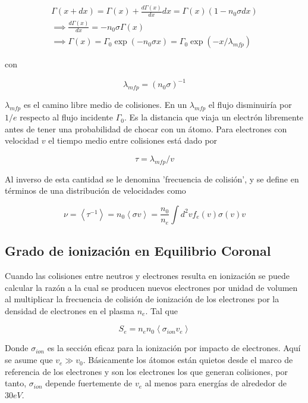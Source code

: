 \documentclass[11pt]{article}
\theoremstyle{definition}
\begin{document}
  \begin{eqnarray*}
    \Gamma(x + dx) = \Gamma(x) + \frac{d\Gamma(x)}{dx}dx = \Gamma(x)(1 - n_0\sigma dx)\\
    \implies \frac{d\Gamma(x)}{dx} = -n_0\sigma\Gamma(x) \\
    \implies \Gamma(x) = \Gamma_0\exp{(-n_0\sigma x)} = \Gamma_0\exp{(-x/\lambda_{mfp})}
  \end{eqnarray*}

  con 

  \begin{equation}
    \lambda_{mfp} = (n_0\sigma)^{-1}
  \end{equation}

  $\lambda_{mfp}$ es el camino libre medio de colisiones. En un $\lambda_{mfp}$ el flujo disminuir\'ia por $1/e$ respecto al flujo incidente $\Gamma_0$. Es la distancia que viaja un electr\'on libremente antes de tener una probabilidad de chocar con un \'atomo. Para electrones con velocidad $v$ el tiempo medio entre colisiones est\'a dado por 

  \begin{equation}
    \tau = \lambda_{mfp}/v
  \end{equation}

  Al inverso de esta cantidad se le denomina 'frecuencia de colisi\'on', y se define en t\'erminos de una distribuci\'on de velocidades como

  \begin{equation}
    \nu = \left<\tau^{-1}\right> = n_0\left<\sigma v\right> = \frac{n_0}{n_e}\int d^2v f_e(v)\sigma(v)v
  \end{equation}

  \subsection{Grado de ionizaci\'on en Equilibrio Coronal}

  Cuando las colisiones entre neutros y electrones resulta en ionizaci\'on se puede calcular la raz\'on a la cual se producen nuevos electrones por unidad de volumen al multiplicar la frecuencia de colisi\'on de ionizaci\'on de los electrones por la densidad de electrones en el plasma $n_e$. Tal que

  \begin{equation}
    S_e = n_en_0\left<\sigma_{ion} v_e\right>
  \end{equation}

  Donde $\sigma_{ion}$ es la secci\'on eficaz para la ionizaci\'on por impacto de electrones. Aqu\'i se asume que $v_e \gg v_0$. B\'asicamente los \'atomos est\'an quietos desde el marco de referencia de los electrones y son los electrones los que generan colisiones, por tanto, $\sigma_{ion}$ depende fuertemente de $v_e$ al menos para energ\'ias de alrededor de $30eV$. 
\end{document}
